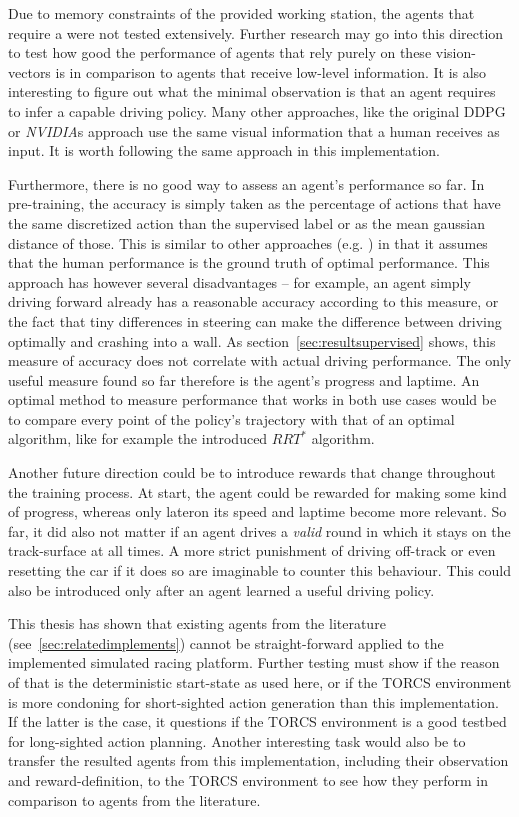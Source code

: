 Due to memory constraints of the provided working station, the agents that require a  were not tested extensively. Further research may go into this direction to test how good the performance of agents that rely purely on these vision-vectors is in comparison to agents that receive low-level information. It is also interesting to figure out what the minimal observation is that an agent requires to infer a capable driving policy. Many other approaches, like the original DDPG \cite{lillicrap_continuous_2015} or \textit{NVIDIA}s approach \cite{bojarski_end_2016} use the same visual information that a human receives as input. It is worth following the same approach in this implementation.

Furthermore, there is no good way to assess an agent's performance so far. In pre-training, the accuracy is simply taken as the percentage of actions that have the same discretized action than the supervised label or as the mean gaussian distance of those. This is similar to other approaches (e.g. \cite{bojarski_end_2016}) in that it assumes that the human performance is the ground truth of optimal performance. This approach has however several disadvantages -- for example, an agent simply driving forward already has a reasonable accuracy according to this measure, or the fact that tiny differences in steering can make the difference between driving optimally and crashing into a wall. As section~\ref{sec:resultsupervised} shows, this measure of accuracy does not correlate with actual driving performance. The only useful measure found so far therefore is the agent's progress and laptime. An optimal method to measure performance that works in both use cases would be to compare every point of the policy's trajectory with that of an optimal algorithm, like for example the introduced $RRT^*$ algorithm.

Another future direction could be to introduce rewards that change throughout the training process. At start, the agent could be rewarded for making some kind of progress, whereas only lateron its speed and laptime become more relevant. So far, it did also not matter if an agent drives a \textit{valid} round in which it stays on the track-surface at all times. A more strict punishment of driving off-track or even resetting the car if it does so are imaginable to counter this behaviour. This could also be introduced only after an agent learned a useful driving policy.

This thesis has shown that existing agents from the literature (see~\ref{sec:relatedimplements}) cannot be straight-forward applied to the implemented simulated racing platform. Further testing must show if the reason of that is the deterministic start-state as used here, or if the TORCS environment is more condoning for short-sighted action generation than this implementation. If the latter is the case, it questions if the TORCS environment is a good testbed for long-sighted action planning. Another interesting task would also be to transfer the resulted agents from this implementation, including their observation and reward-definition, to the TORCS environment to see how they perform in comparison to agents from the literature. 

